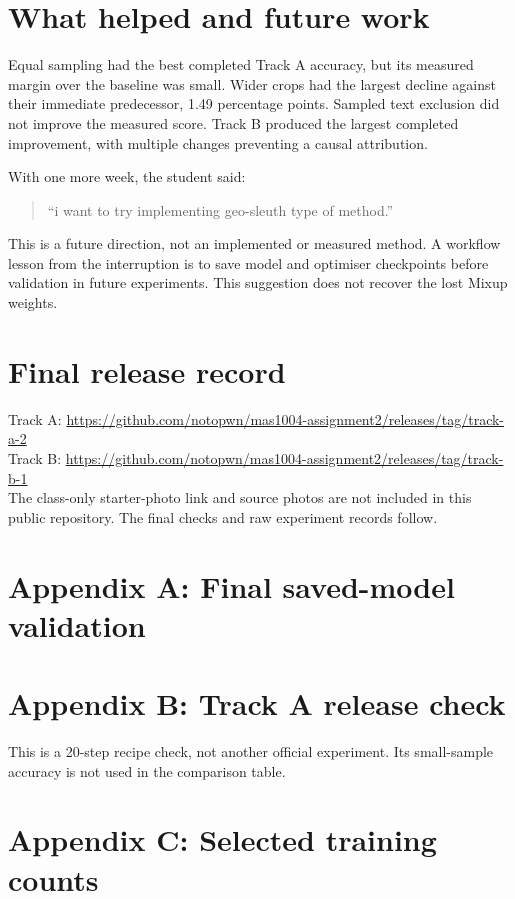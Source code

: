\documentclass[11pt]{article}
\begin{document}
\section*{What helped and future work}
Equal sampling had the best completed Track A accuracy, but its measured margin over the baseline was small. Wider crops had the largest decline against their immediate predecessor, 1.49 percentage points. Sampled text exclusion did not improve the measured score. Track B produced the largest completed improvement, with multiple changes preventing a causal attribution.

With one more week, the student said:
\begin{quote}
``i want to try implementing geo-sleuth type of method.''
\end{quote}
This is a future direction, not an implemented or measured method. A workflow lesson from the interruption is to save model and optimiser checkpoints before validation in future experiments. This suggestion does not recover the lost Mixup weights.

\section*{Final release record}
Track A: \url{https://github.com/notopwn/mas1004-assignment2/releases/tag/track-a-2}\\
Track B: \url{https://github.com/notopwn/mas1004-assignment2/releases/tag/track-b-1}\\
The class-only starter-photo link and source photos are not included in this public repository. The final checks and raw experiment records follow.

\clearpage
\section*{Appendix A: Final saved-model validation}
\section*{Appendix B: Track A release check}
This is a 20-step recipe check, not another official experiment. Its small-sample accuracy is not used in the comparison table.
\section*{Appendix C: Selected training counts}
\end{document}
